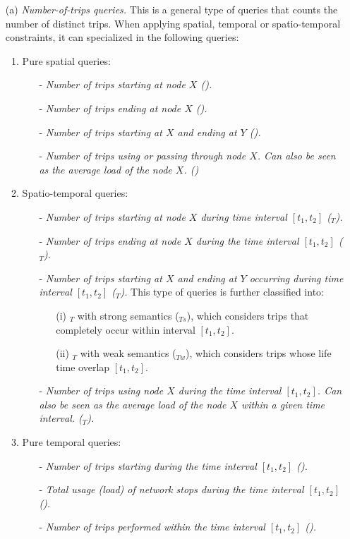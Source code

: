 	\begin{itemize}
		\item[(a)] {\em Number-of-trips queries.} This is a general type of queries that counts the number of distinct trips. When applying spatial, temporal or spatio-temporal constraints, it can specialized in the following queries:
		
		\begin{enumerate}
			\item Pure spatial queries:
			\begin{itemize}
				\item[-] {\em Number of trips starting at node $X$ (\startX).}
				\item[-] {\em Number of trips ending at node $X$ (\endX).} 
				\item[-] {\em Number of trips starting at $X$ and ending at $Y$ (\XtoY).}
				\item[-] {\em Number of trips using or passing through node $X$. Can also be seen as the average load of the node $X$. (\loadX)}
			\end{itemize}
			
			\item Spatio-temporal queries:
			\begin{itemize}
				\item[-] {\em Number of trips starting at node $X$ during time interval $[t_1,t_2]$ (\startX$_T$).}
				\item[-] {\em Number of trips ending at node $X$ during the time interval $[t_1,t_2]$ (\endX$_T$). }
				\item[-] {\em Number of trips starting at $X$ and ending at $Y$ occurring during  time interval $[t_1,t_2]$ (\XtoY$_T$).} This type of queries is further classified into: 
				\begin{itemize}
				    \item[(i)] \XtoY$_T$ with strong semantics (\XtoY$_{Ts}$), which considers trips that completely occur within interval $[t_1,t_2]$.
				    \item[(ii)] \XtoY$_T$ with weak semantics (\XtoY$_{Tw}$), which considers trips whose life time overlap $[t_1,t_2]$.
				\end{itemize}
				\item[-] {\em Number of trips using node $X$ during the time interval $[t_1,t_2]$. Can also be seen as the average load of the node $X$ within a given time interval. (\loadX$_T$).}
			\end{itemize}
			
			\item Pure temporal queries:
			\begin{itemize}
				\item[-] {\em Number of trips starting during the time interval $[t_1,t_2]$ (\startT). } 
				\item[-] {\em Total usage (load) of network stops during the time interval $[t_1,t_2]$ (\loadT).}
				\item[-] {\em Number of trips performed within the time interval $[t_1,t_2]$ (\tripT).} 
			\end{itemize}
		\end{enumerate}
		

\end{itemize}
